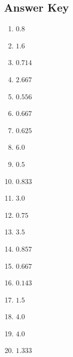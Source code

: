 \documentclass{article}
\begin{document}
\newpage

\subsection*{Answer Key}

\begin{enumerate}
\item $\displaystyle 0.8 $ \ 
\item $\displaystyle 1.6 $ \ 
\item $\displaystyle 0.714 $ \ 
\item $\displaystyle 2.667 $ \ 
\item $\displaystyle 0.556 $ \ 
\item $\displaystyle 0.667 $ \ 
\item $\displaystyle 0.625 $ \ 
\item $\displaystyle 6.0 $ \ 
\item $\displaystyle 0.5 $ \ 
\item $\displaystyle 0.833 $ \ 
\item $\displaystyle 3.0 $ \ 
\item $\displaystyle 0.75 $ \ 
\item $\displaystyle 3.5 $ \ 
\item $\displaystyle 0.857 $ \ 
\item $\displaystyle 0.667 $ \ 
\item $\displaystyle 0.143 $ \ 
\item $\displaystyle 1.5 $ \ 
\item $\displaystyle 4.0 $ \ 
\item $\displaystyle 4.0 $ \ 
\item $\displaystyle 1.333 $ \ 

\end{enumerate}
\end{document}
